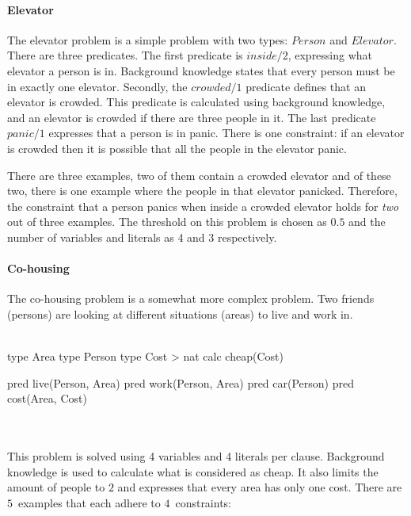 \paragraph{Elevator}
The elevator problem is a simple problem with two types: $\mathit{Person}$ and $\mathit{Elevator}$.
There are three predicates.
The first predicate is $\mathit{inside}/2$, expressing what elevator a person is in.
Background knowledge states that every person must be in exactly one elevator.
Secondly, the $\mathit{crowded}/1$ predicate defines that an elevator is crowded.
This predicate is calculated using background knowledge, and an elevator is crowded if there are three people in it.
The last predicate $\mathit{panic}/1$ expresses that a person is in panic.
There is one constraint: if an elevator is crowded then it is possible that all the people in the elevator panic.

There are three examples, two of them contain a crowded elevator and of these two, there is one example where the people in that elevator panicked.
Therefore, the constraint that a person panics when inside a crowded elevator holds for \emph{two} out of three examples.
The threshold on this problem is chosen as $0.5$ and the number of variables and literals as 4 and 3 respectively.

\paragraph{Co-housing}
The co-housing problem is a somewhat more complex problem.
Two friends (persons) are looking at different situations (areas) to live and work in.
\\\\
\begin{minipage}{0.5\textwidth}
	\begin{verbatim*}
		type Area
		type Person
		type Cost > nat
		calc cheap(Cost)
	\end{verbatim*}
\end{minipage}
\begin{minipage}{0.5\textwidth}
	\begin{verbatim*}
		pred live(Person, Area)
		pred work(Person, Area)
		pred car(Person)
		pred cost(Area, Cost)
	\end{verbatim*}
\end{minipage}
\\\\

This problem is solved using 4 variables and 4 literals per clause.
Background knowledge is used to calculate what is considered as cheap.
It also limits the amount of people to $2$ and expresses that every area has only one cost.
There are $5$~examples that each adhere to $4$~constraints:

